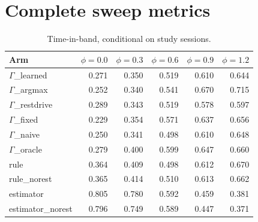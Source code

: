 \documentclass{article}
\begin{document}
\section{Complete sweep metrics}
\label{app:fulltables}
\begin{table}[H]
  \caption{Time-in-band, conditional on study sessions.}
  \label{app:tiz}
  \centering
  \small
  \begin{tabular}{lrrrrr}
    \toprule
    Arm & $\phi{=}0.0$ & $\phi{=}0.3$ & $\phi{=}0.6$ & $\phi{=}0.9$ & $\phi{=}1.2$ \\
    \midrule
    $\Gamma$\_learned & 0.271 & 0.350 & 0.519 & 0.610 & 0.644 \\
    $\Gamma$\_argmax & 0.252 & 0.340 & 0.541 & 0.670 & 0.715 \\
    $\Gamma$\_restdrive & 0.289 & 0.343 & 0.519 & 0.578 & 0.597 \\
    $\Gamma$\_fixed & 0.229 & 0.354 & 0.571 & 0.637 & 0.656 \\
    $\Gamma$\_naive & 0.250 & 0.341 & 0.498 & 0.610 & 0.648 \\
    $\Gamma$\_oracle & 0.279 & 0.400 & 0.599 & 0.647 & 0.660 \\
    rule & 0.364 & 0.409 & 0.498 & 0.612 & 0.670 \\
    rule\_norest & 0.365 & 0.414 & 0.510 & 0.613 & 0.662 \\
    estimator & 0.805 & 0.780 & 0.592 & 0.459 & 0.381 \\
    estimator\_norest & 0.796 & 0.749 & 0.589 & 0.447 & 0.371 \\
    \bottomrule
  \end{tabular}
\end{table}
\end{document}

